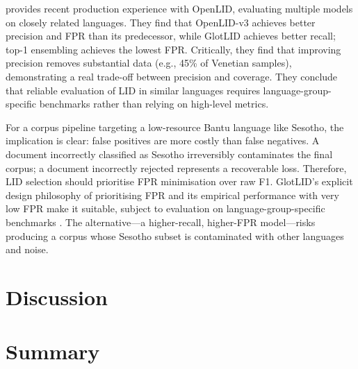 \documentclass[11pt,a4paper]{article}
\begin{document}
\citet{fedorova2026openlid} provides recent production experience with OpenLID, evaluating multiple models on closely related languages. They find that OpenLID-v3 achieves better precision and FPR than its predecessor, while GlotLID achieves better recall; top-1 ensembling achieves the lowest FPR. Critically, they find that improving precision removes substantial data (e.g., 45\% of Venetian samples), demonstrating a real trade-off between precision and coverage. They conclude that reliable evaluation of LID in similar languages requires language-group-specific benchmarks rather than relying on high-level metrics.

For a corpus pipeline targeting a low-resource Bantu language like Sesotho, the implication is clear: false positives are more costly than false negatives. A document incorrectly classified as Sesotho irreversibly contaminates the final corpus; a document incorrectly rejected represents a recoverable loss. Therefore, LID selection should prioritise FPR minimisation over raw F1. GlotLID's explicit design philosophy of prioritising FPR \citet{kargaran2024glotcc} and its empirical performance with very low FPR make it suitable, subject to evaluation on language-group-specific benchmarks \citep{fedorova2026openlid}. The alternative—a higher-recall, higher-FPR model—risks producing a corpus whose Sesotho subset is contaminated with other languages and noise.

\section{Discussion}


\section{Summary}


  
\end{document}
